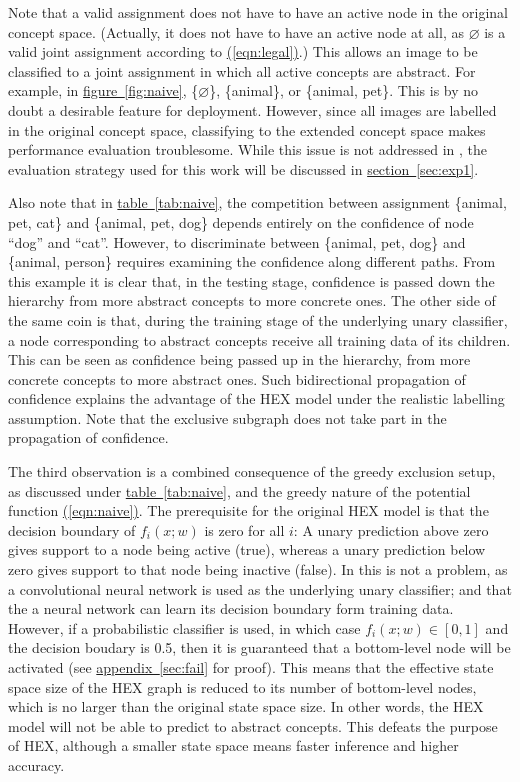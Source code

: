 \documentclass[11pt,a4paper]{article}
\begin{document}
Note that a valid assignment does not have to have an active node in the original concept space. (Actually, it does not have to have an active node at all, as $\varnothing$ is a valid joint assignment according to \hyperref[eqn:legal]{(\ref{eqn:legal})}.) This allows an image to be classified to a joint assignment in which all active concepts are abstract. For example, in \hyperref[fig:naive]{figure~\ref{fig:naive}}, \{$\varnothing$\}, \{animal\}, or \{animal, pet\}. This is by no doubt a desirable feature for deployment. However, since all images are labelled in the original concept space, classifying to the extended concept space makes performance evaluation troublesome. While this issue is not addressed in \cite{deng2014large}, the evaluation strategy used for this work will be discussed in \hyperref[sec:exp1]{section~\ref{sec:exp1}}.

Also note that in \hyperref[tab:naive]{table~\ref{tab:naive}}, the competition between assignment \{animal, pet, cat\} and \{animal, pet, dog\} depends entirely on the confidence of node ``dog'' and ``cat''. However, to discriminate between \{animal, pet, dog\} and \{animal, person\} requires examining the confidence along different paths. From this example it is clear that, in the testing stage, confidence is passed down the hierarchy from more abstract concepts to more concrete ones. The other side of the same coin is that, during the training stage of the underlying unary classifier, a node corresponding to abstract concepts receive all training data of its children. This can be seen as confidence being passed up in the hierarchy, from more concrete concepts to more abstract ones. Such bidirectional propagation of confidence explains the advantage of the HEX model under the realistic labelling assumption. Note that the exclusive subgraph does not take part in the propagation of confidence.

The third observation is a combined consequence of the greedy exclusion setup, as discussed under \hyperref[tab:naive]{table~\ref{tab:naive}}, and the greedy nature of the potential function \hyperref[eqn:naive]{(\ref{eqn:naive})}. The prerequisite for the original HEX model is that the decision boundary of $f_i(x;w)$ is zero for all $i$: A unary prediction above zero gives support to a node being active (true), whereas a unary prediction below zero gives support to that node being inactive (false). In \cite{deng2014large} this is not a problem, as a convolutional neural network \cite{krizhevsky2012imagenet} is used as the underlying unary classifier; and that the a neural network can learn its decision boundary form training data. However, if a probabilistic classifier is used, in which case $f_i(x;w)\in[0,1]$ and the decision boudary is 0.5, then it is guaranteed that a bottom-level node will be activated (see \hyperref[sec:fail]{appendix~\ref{sec:fail}} for proof). This means that the effective state space size of the HEX graph is reduced to its number of bottom-level nodes, which is no larger than the original state space size. In other words, the HEX model will not be able to predict to abstract concepts. This defeats the purpose of HEX, although a smaller state space means faster inference and higher accuracy.
\end{document}
